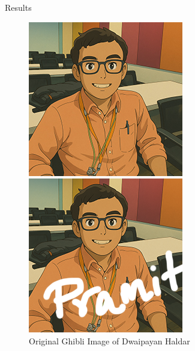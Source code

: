 \documentclass{beamer}
\begin{document}
\begin{frame}{Results}
    \begin{figure}[h]
    \centering
    \begin{minipage}{0.32\textwidth}
        \centering
        \includegraphics[width=\linewidth]{Image_ghibli.jpg} %
        \caption{Original Ghibli Image of Dwaipayan Haldar}
    \end{minipage}
    \hfill
    \begin{minipage}{0.32\textwidth}
        \centering
        \includegraphics[width=\linewidth]{Image_ghibli_Pramit.png} %

\end{minipage}
\end{figure}
\end{frame}
\end{document}
